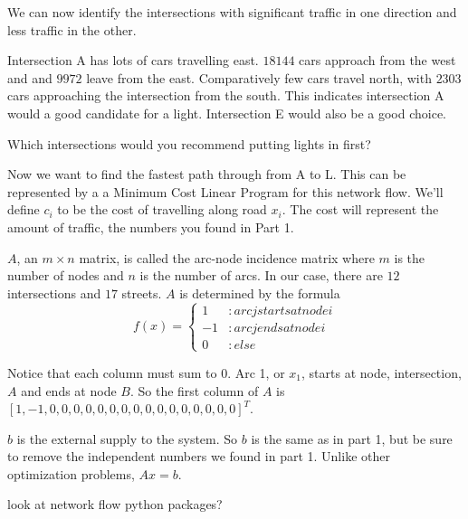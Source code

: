 We can now identify the intersections with significant traffic in one direction and less traffic in the other.
 
Intersection A has lots of cars travelling east. $18144$ cars approach from the west and and $9972$ leave from the east. Comparatively few cars travel north, with $2303$ cars approaching the intersection from the south. This indicates intersection A would a good candidate for a light. Intersection E would also be a good choice. 

Which intersections would you recommend putting lights in first?
 
Now we want to find the fastest path through from A to L. This can be represented by a a Minimum Cost Linear Program for this network flow.
We'll define $c_i$ to be the cost of travelling along road $x_i$. The cost will represent the amount of traffic, the numbers you found in Part 1.

$A$, an $m\times n$ matrix, is called the arc-node incidence matrix where $m$ is the number of nodes and $n$ is the number of arcs. In our case, there are $12$ intersections and $17$ streets. $A$ is determined by the formula
\begin{displaymath}
   f(x) = \left\{
     \begin{array}{lr}
       1 & : arc j starts at node i\\
       -1 & : arc j ends at node i\\
       0 & : else
     \end{array}
   \right.
\end{displaymath}
 
Notice that each column must sum to $0$.
Arc 1, or $x_1$, starts at node, intersection, $A$ and ends at node $B$. So the first column of $A$ is $[1,-1,0,0,0,0,0,0,0,0,0,0,0,0,0,0,0,0]^T$.

$b$ is the external supply to the system. So $b$ is the same as in part 1, but be sure to remove the independent numbers we found in part 1. Unlike other optimization problems, $Ax=b$.  



look at network flow python packages?